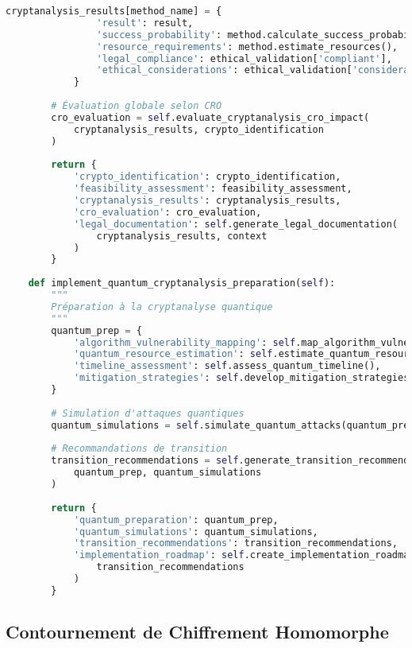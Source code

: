 \begin{lstlisting}[language=Python, caption=Framework de cryptanalyse forensique]
            cryptanalysis_results[method_name] = {
                'result': result,
                'success_probability': method.calculate_success_probability(),
                'resource_requirements': method.estimate_resources(),
                'legal_compliance': ethical_validation['compliant'],
                'ethical_considerations': ethical_validation['considerations']
            }
            
        # Évaluation globale selon CRO
        cro_evaluation = self.evaluate_cryptanalysis_cro_impact(
            cryptanalysis_results, crypto_identification
        )
        
        return {
            'crypto_identification': crypto_identification,
            'feasibility_assessment': feasibility_assessment,
            'cryptanalysis_results': cryptanalysis_results,
            'cro_evaluation': cro_evaluation,
            'legal_documentation': self.generate_legal_documentation(
                cryptanalysis_results, context
            )
        }
    
    def implement_quantum_cryptanalysis_preparation(self):
        """
        Préparation à la cryptanalyse quantique
        """
        quantum_prep = {
            'algorithm_vulnerability_mapping': self.map_algorithm_vulnerabilities(),
            'quantum_resource_estimation': self.estimate_quantum_resources(),
            'timeline_assessment': self.assess_quantum_timeline(),
            'mitigation_strategies': self.develop_mitigation_strategies()
        }
        
        # Simulation d'attaques quantiques
        quantum_simulations = self.simulate_quantum_attacks(quantum_prep)
        
        # Recommandations de transition
        transition_recommendations = self.generate_transition_recommendations(
            quantum_prep, quantum_simulations
        )
        
        return {
            'quantum_preparation': quantum_prep,
            'quantum_simulations': quantum_simulations,
            'transition_recommendations': transition_recommendations,
            'implementation_roadmap': self.create_implementation_roadmap(
                transition_recommendations
            )
        }
\end{lstlisting}

\subsection{Contournement de Chiffrement Homomorphe}


